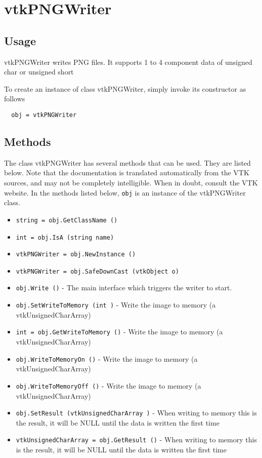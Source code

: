 \section{vtkPNGWriter}

\subsection{Usage}

 vtkPNGWriter writes PNG files. It supports 1 to 4 component data of
 unsigned char or unsigned short

To create an instance of class vtkPNGWriter, simply
invoke its constructor as follows
\begin{verbatim}
  obj = vtkPNGWriter
\end{verbatim}
\subsection{Methods}

The class vtkPNGWriter has several methods that can be used.
  They are listed below.
Note that the documentation is translated automatically from the VTK sources,
and may not be completely intelligible.  When in doubt, consult the VTK website.
In the methods listed below, \verb|obj| is an instance of the vtkPNGWriter class.
\begin{itemize}
\item  \verb|string = obj.GetClassName ()|

\item  \verb|int = obj.IsA (string name)|

\item  \verb|vtkPNGWriter = obj.NewInstance ()|

\item  \verb|vtkPNGWriter = obj.SafeDownCast (vtkObject o)|

\item  \verb|obj.Write ()| -  The main interface which triggers the writer to start.

\item  \verb|obj.SetWriteToMemory (int )| -  Write the image to memory (a vtkUnsignedCharArray)

\item  \verb|int = obj.GetWriteToMemory ()| -  Write the image to memory (a vtkUnsignedCharArray)

\item  \verb|obj.WriteToMemoryOn ()| -  Write the image to memory (a vtkUnsignedCharArray)

\item  \verb|obj.WriteToMemoryOff ()| -  Write the image to memory (a vtkUnsignedCharArray)

\item  \verb|obj.SetResult (vtkUnsignedCharArray )| -  When writing to memory this is the result, it will be NULL until the 
 data is written the first time

\item  \verb|vtkUnsignedCharArray = obj.GetResult ()| -  When writing to memory this is the result, it will be NULL until the 
 data is written the first time

\end{itemize}
